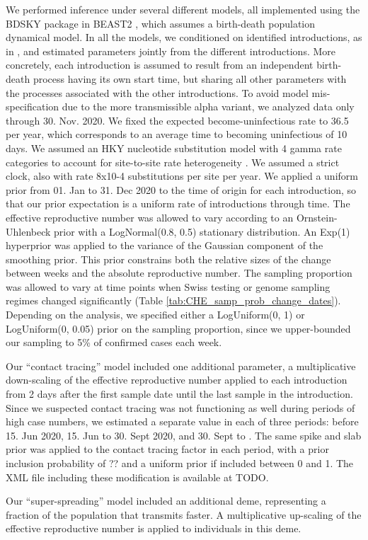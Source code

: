 \documentclass[9pt,twoside,lineno]{pnas-new} %
\begin{document}
We performed inference under several different models, all implemented using the BDSKY package \cite{stadler2013birth} in BEAST2 \cite{Bouckaert2019}, which assumes a birth-death population dynamical model. In all the models, we conditioned on identified introductions, as in \cite{Muller2020}, and estimated parameters jointly from the different introductions. More concretely, each introduction is assumed to result from an independent birth-death process having its own start time, but sharing all other parameters with the processes associated with the other introductions. To avoid model mis-specification due to the more transmissible alpha variant, we analyzed data only through 30. Nov. 2020. We fixed the expected become-uninfectious rate to 36.5 per year, which corresponds to an average time to becoming uninfectious of 10 days. We assumed an HKY \cite{Hasegawa1985} nucleotide substitution model with 4 gamma rate categories to account for site-to-site rate heterogeneity \cite{Yang1994}. We assumed a strict clock, also with rate 8x10-4 substitutions per site per year. We applied a uniform prior from 01. Jan to 31. Dec 2020 to the time of origin for each introduction, so that our prior expectation is a uniform rate of introductions through time. The effective reproductive number was allowed to vary according to an Ornstein-Uhlenbeck prior with a LogNormal(0.8, 0.5) stationary distribution. An Exp(1) hyperprior was applied to the variance of the Gaussian component of the smoothing prior. This prior constrains both the relative sizes of the change between weeks and the absolute reproductive number. The sampling proportion was allowed to vary at time points when Swiss testing or genome sampling regimes changed significantly (Table \ref{tab:CHE_samp_prob_change_dates}). Depending on the analysis, we specified either a LogUniform(0, 1) or LogUniform(0, 0.05) prior on the sampling proportion, since we upper-bounded our sampling to 5\% of confirmed cases each week.

Our ``contact tracing'' model included one additional parameter, a multiplicative down-scaling of the effective reproductive number applied to each introduction from 2 days after the first sample date until the last sample in the introduction. Since we suspected contact tracing was not functioning as well during periods of high case numbers, we estimated a separate value in each of three periods: before 15. Jun 2020, 15. Jun to 30. Sept 2020, and 30. Sept to \maxdate. The same spike and slab prior was applied to the contact tracing factor in each period, with a prior inclusion probability of ?? and a uniform prior if included between 0 and 1. The XML file including these modification is available at TODO.

Our ``super-spreading'' model included an additional deme, representing a fraction of the population that transmits faster. A multiplicative up-scaling of the effective reproductive number is applied to individuals in this deme.


\showacknow{} %


\end{document}
